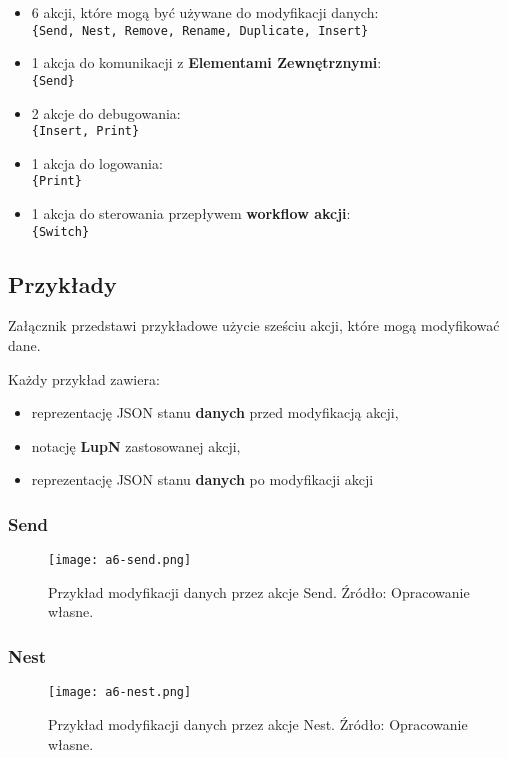 \begin{itemize}
    \item 6 akcji, które mogą być używane do modyfikacji danych: \\ 
          \texttt{\{Send, Nest, Remove, Rename, Duplicate, Insert\}}
    \item 1 akcja do komunikacji z \textbf{Elementami Zewnętrznymi}: \\ 
          \texttt{\{Send\}}
    \item 2 akcje do debugowania: \\ 
          \texttt{\{Insert, Print\}}
    \item 1 akcja do logowania: \\ 
          \texttt{\{Print\}}
    \item 1 akcja do sterowania przepływem \textbf{workflow akcji}: \\ 
          \texttt{\{Switch\}}
\end{itemize}

\subsection{Przykłady}

Załącznik przedstawi przykładowe użycie sześciu akcji, które mogą modyfikować dane.

Każdy przykład zawiera:

\begin{itemize}
    \item reprezentację JSON stanu \textbf{danych} przed modyfikacją akcji,
    \item notację \textbf{LupN} zastosowanej akcji,
    \item reprezentację JSON stanu \textbf{danych} po modyfikacji akcji
\end{itemize}

\subsubsection{Send}
\begin{figure}[!h]
    \centering \texttt{[image: a6-send.png]}
    \caption{Przykład modyfikacji danych przez akcje Send. Źródło: Opracowanie własne.}\label{fig:a6-send}
\end{figure}
\subsubsection{Nest}
\begin{figure}[!h]
    \centering \texttt{[image: a6-nest.png]}
    \caption{Przykład modyfikacji danych przez akcje Nest. Źródło: Opracowanie własne.}\label{fig:a6-nest}
\end{figure}

